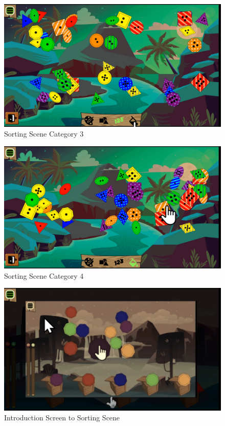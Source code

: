 \begin{figure}[H]
    \centering
    \includegraphics[width=1\textwidth]{figures/sortingscene4}
    \caption{Sorting Scene Category 3}
    \label{fig:sortingscene4}
\end{figure}

\begin{figure}[H]
    \centering
    \includegraphics[width=1\textwidth]{figures/sortingscene5}
    \caption{Sorting Scene Category 4}
    \label{fig:sortingscene5}
\end{figure}

\begin{figure}[H]
    \centering
    \includegraphics[width=1\textwidth]{figures/introduction}
    \caption{Introduction Screen to Sorting Scene}
    \label{fig:introduction}
\end{figure}

